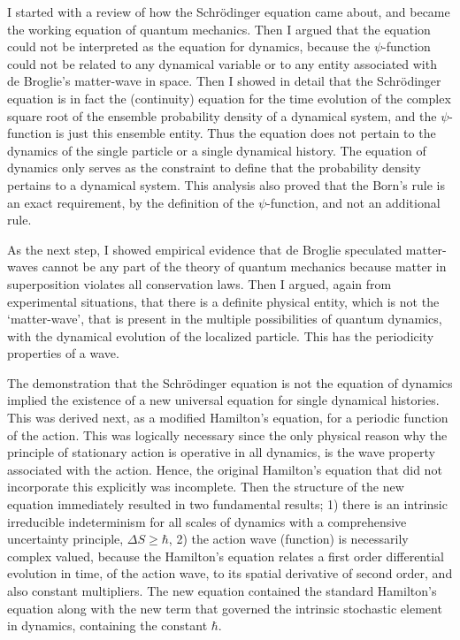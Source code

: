 I started with a review of how the Schr\"{o}dinger equation came about, and became the
working equation of quantum mechanics. Then I argued that the equation could not be
interpreted as the equation for dynamics, because the $\psi$-function could not be related to
any dynamical variable or to any entity associated with de Broglie's matter-wave in space.
Then I showed in detail that the Schr\"{o}dinger equation is in fact the (continuity) equation
for the time evolution of the complex square root of the ensemble probability density of a
dynamical system, and the $\psi$-function is just this ensemble entity. Thus the equation does
not pertain to the dynamics of the single particle or a single dynamical history. The equation
of dynamics only serves as the constraint to define that the probability density pertains to
a dynamical system. This analysis also proved that the Born's rule is an exact requirement,
by the definition of the $\psi$-function, and not an additional rule.

As the next step, I showed empirical evidence that de Broglie speculated matter-waves
cannot be any part of the theory of quantum mechanics because matter in superposition
violates all conservation laws. Then I argued, again from experimental situations, that there
is a definite physical entity, which is not the `matter-wave', that is present in the multiple
possibilities of quantum dynamics, with the dynamical evolution of the localized particle. This has the periodicity properties of a wave.

The demonstration that the Schrödinger equation is not the equation of dynamics implied
the existence of a new universal equation for single dynamical histories. This was derived
next, as a modified Hamilton's equation, for a periodic function of the action. This was
logically necessary since the only physical reason why the principle of stationary action
is operative in all dynamics, is the wave property associated with the action. Hence, the
original Hamilton's equation that did not incorporate this explicitly was incomplete. Then
the structure of the new equation immediately resulted in two fundamental results; 1) there
is an intrinsic irreducible indeterminism for all scales of dynamics with a comprehensive
uncertainty principle, $\Delta S \geq  \hbar$, 2) the action wave (function) is necessarily complex valued,
because the Hamilton's equation relates a first order differential evolution in time, of the
action wave, to its spatial derivative of second order, and also constant multipliers. The
new equation contained the standard Hamilton's equation along with the new term that
governed the intrinsic stochastic element in dynamics, containing the constant $\hbar$.
\newpage

